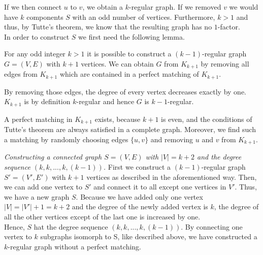 \documentclass[a4paper]{article}
\begin{document}
\begin{solution}{11}
		If we then connect $u$ to $v$, we obtain a $k$-regular graph. If we removed $v$ we would have $k$ components $S$ with an odd number of vertices. Furthermore, $k > 1$ and thus, by Tutte's theorem, we know that the resulting graph has no $1$-factor.\\
		
		In order to construct $S$ we first need the following lemma.
		\begin{lemma}{For any odd integer $k > 1$ it is possible to construct a $(k-1)$-regular graph $G=(V,E)$ with $k+1$ vertices.}
			We can obtain $G$ from $K_{k+1}$ by removing all edges from $K_{k+1}$ which are contained in a perfect matching of $K_{k+1}$. 

			By removing those edges, the degree of every vertex decreases exactly by one. 
			$K_{k+1}$ is by definition $k$-regular and hence $G$ is $k-1$-regular.

			A perfect matching in $K_{k+1}$ exists, because $k+1$ is even, and the conditions of Tutte's theorem are always satisfied in a complete graph. Moreover, we find such a matching by randomly choosing edges $\{u,v\}$ and removing $u$ and $v$ from $K_{k+1}$. 
		\end{lemma}
		
		\emph{Constructing a connected graph $S=(V,E)$ with $|V|=k+2$ and the degree sequence $( k,k,...,k,(k-1))$. }  
		First we construct a $(k-1)$-regular graph $S' = (V',E')$ with $k+1$ vertices as described in the aforementioned way. Then, we can add one vertex to $S'$ and connect it to all except one vertices in $V'$. Thus, we have a new graph $S$. 
		Because we have added only one vertex $|V| = |V'| +1 = k+2$ and the degree of the newly added vertex is $k$, the degree of all the other vertices except of the last one is increased by one.\\

		Hence, $S$ hat the degree sequence $(k,k,...,k,(k-1))$. 
		By connecting one vertex to $k$ subgraphs isomorph to S, like described above, we have constructed a $k$-regular graph without a perfect matching.
		\begin{figure}[h]
			\centering
\end{figure}
\end{solution}
\end{document}
